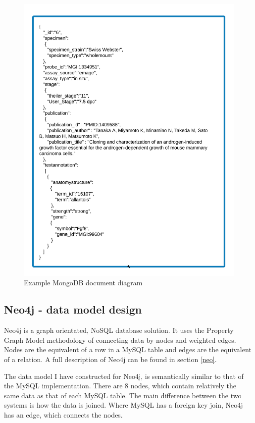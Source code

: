 \newpage
\begin{figure}[H]\begin{center}\includegraphics[width=1\linewidth]{images/mongo_modeldesign}\caption{Example MongoDB document diagram}\label{fig:mongo}\end{center}\end{figure}

\newpage
\subsection{Neo4j - data model design}
Neo4j is a graph orientated, NoSQL database solution. It uses the Property Graph Model methodology of connecting data by nodes and weighted edges. Nodes are the equivalent of a row in a MySQL table and edges are the equivalent of a relation. A full description of Neo4j can be found in section \ref{neo}.

The data model I have constructed for Neo4j, is semantically similar to that of the MySQL implementation. There are 8 nodes, which contain relatively the same data as that of each MySQL table. The main difference between the two systems is how the data is joined. Where MySQL has a foreign key join, Neo4j has an edge, which connects the nodes.

